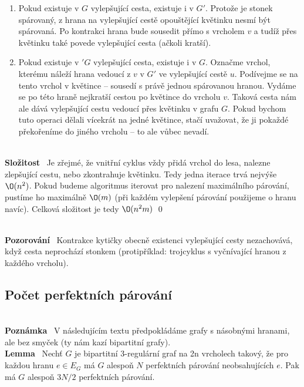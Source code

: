 \documentclass{article}
\renewcommand{\paragraph}[1]{\ \\\smallskip\noindent\textbf{#1}\ }
\begin{document}
\begin{enumerate}
	\item Pokud existuje v $G$ vylepšující cesta, existuje i v $G'$. Protože je 
	stonek spárovaný, z hrana na vylepšující cestě opouštějící květinku nesmí 
	být spárovaná.  Po kontrakci hrana bude sousedit přímo s vrcholem $v$ a 
	tudíž přes květinku také povede vylepšující cesta (ačkoli kratší).
	\item Pokud existuje v $'G$ vylepšující cesta, existuje i v $G$. Označme 
	vrchol, kterému náleží hrana vedoucí z $v$ v $G'$ ve vylepšující cestě $u$.  
	Podívejme se na tento vrchol v květince -- sousedí s právě jednou spárovanou 
	hranou. Vydáme se po této hraně nejkratší cestou po květince do vrcholu $v$.  
	Taková cesta nám ale dává vylepšující cestu vedoucí přes květinku v grafu 
	$G$. Pokud bychom tuto operaci dělali vícekrát na jedné květince, stačí 
	uvažovat, že ji pokaždé překořeníme do jiného vrcholu -- to ale vůbec 
	nevadí.
\end{enumerate}
\paragraph{Složitost}
Je zřejmé, že vnitřní cyklus vždy přidá vrchol do lesa, nalezne zlepšující 
cestu, nebo zkontrahuje květinku. Tedy jedna iterace trvá nejvýše $\O(n^2)$.  
Pokud budeme algoritmus iterovat pro nalezení maximálního párování, pustíme ho 
maximálně $\O(m)$ (při každém vylepšení párování použijeme o hranu navíc).  
Celková složitost je tedy $\O(n^2m)$
\qed

\paragraph{Pozorování}
Kontrakce kytičky obecně existenci vylepšující cesty nezachovává, když cesta 
neprochází stonkem (protipříklad: trojcyklus s vyčnívající hranou z každého 
vrcholu).
\subsection{Počet perfektních párování}
\paragraph{Poznámka} V následujícím textu předpokládáme grafy s násobnými 
hranami, ale bez smyček (ty nám kazí bipartitní grafy).
\paragraph{Lemma} Nechť $G$ je bipartitní 3-regulární graf na 2n vrcholech 
takový, že pro každou hranu $e \in E_G$ má $G$ alespoň $N$ perfektních párování 
neobsahujících $e$. Pak má $G$ alespoň $3N/2$ perfektních párování.
\end{document}
